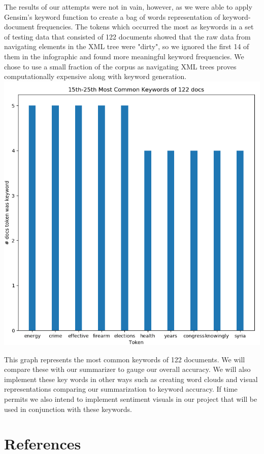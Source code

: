 \documentclass[11pt,a4paper]{article}
\begin{document}
  The results of our attempts were not in vain, however, as we were able to apply Gensim's keyword function to create a bag of words representation of keyword-document frequencies. The tokens which occurred the most as keywords in a set of testing data that consisted of 122 documents showed that the raw data from navigating elements in the XML tree were "dirty", so we ignored the first 14 of them in the infographic and found more meaningful keyword frequencies. We chose to use a small fraction of the corpus as navigating XML trees proves computationally expensive along with keyword generation.\\
  \includegraphics[scale=0.5]{test_kw-mostcommon_15-25}
  
  This graph represents the most common keywords of 122 documents. We will compare these with our summarizer to gauge our overall accuracy. We will also implement these key words in other ways such as creating word clouds and visual representations comparing our summarization to keyword accuracy. If time permits we also intend to implement sentiment visuals in our project that will be used in conjunction with these keywords.
  
  

\clearpage
\section{References}
\end{document}
